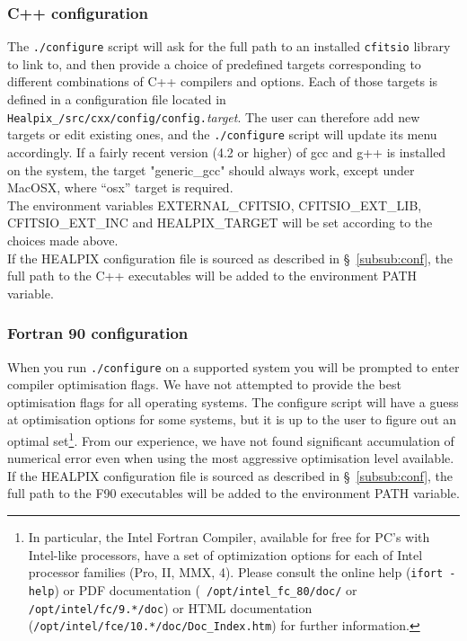 \documentclass[12pt,twoside]{article}
\begin{document}
\subsubsection{C++ configuration}
The {\tt ./configure} script will 
ask for the full path to an installed {\tt cfitsio} library to link to, and then provide a choice of
predefined targets corresponding to different combinations of C++ compilers and
options. Each of those targets is defined in a configuration file located in
{\tt Healpix\_\hpxversion/src/cxx/config/config.}{\em target}.
The user can therefore add new targets or edit existing ones, and the
{\tt ./configure} script will update its menu accordingly.
If a fairly recent version
(4.2 or higher) of gcc and g++ is installed on the system, the target
"generic\_gcc" should always work, except under MacOSX, where ``osx'' target is
required.  \\
The environment variables EXTERNAL\_CFITSIO, 
CFITSIO\_EXT\_LIB, 
CFITSIO\_EXT\_INC and 
HEALPIX\_TARGET 
will be set according to the choices made above.
\\
If the HEALPIX configuration file is sourced as described in \S~\ref{subsub:conf}, the full path to the C++
executables will be added to the environment PATH variable.


\subsubsection{Fortran 90 configuration}
When you run {\tt ./configure} on a supported system 
you will be prompted to enter compiler optimisation flags.
We have not attempted to provide the best optimisation flags for all
operating systems. The configure
script will have a guess at optimisation options for some systems, but it
is up to the user to figure out an optimal set\footnote{In particular, the Intel Fortran
Compiler, available for free for PC's with Intel-like processors, have a set of
optimization options for each of Intel processor families (Pro, II, MMX, 4). Please consult
the online help ({\tt ifort -help}) or PDF documentation ({\tt
/opt/intel\_fc\_80/doc/} or {\tt /opt/intel/fc/9.*/doc}) or HTML documentation
({\tt /opt/intel/fce/10.*/doc/Doc\_Index.htm}) for further information.}. From our experience,
we have not found significant accumulation of numerical error even
when using the most aggressive optimisation level available. \\
If the HEALPIX configuration file is sourced as described in \S~\ref{subsub:conf}, the full path to the F90
executables will be added to the environment PATH variable.
\end{document}

